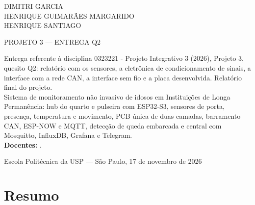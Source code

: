 \documentclass[12pt,a4paper]{article}
\newcommand{\docentes}{}
\begin{document}
	\begin{titlepage}
		\centering

		{\large DIMITRI GARCIA\\HENRIQUE GUIMAR\~AES MARGARIDO\\HENRIQUE SANTIAGO\\}

		\vspace{4cm}
		{\LARGE{PROJETO 3 --- ENTREGA Q2}} \\
		\vspace{2cm}
		\begin{flushright}
			\begin{minipage}{0.55\textwidth}
				Entrega referente à disciplina 0323221 - Projeto Integrativo 3 (2026),
				Projeto 3, quesito Q2: relatório com os sensores, a eletrônica de
				condicionamento de sinais, a interface com a rede CAN, a interface sem fio
				e a placa desenvolvida. Relatório final do projeto. \\[0.5cm]
				Sistema de monitoramento não invasivo de idosos em Instituições de Longa
				Permanência: hub do quarto e pulseira com ESP32-S3, sensores de porta,
				presença, temperatura e movimento, PCB única de duas camadas, barramento
				CAN, ESP-NOW e MQTT, detecção de queda embarcada e central com Mosquitto,
				InfluxDB, Grafana e Telegram.
				\ifx\docentes\empty\else\\[0.5cm]\textbf{Docentes:} \docentes.\fi
			\end{minipage}
		\end{flushright}

		\vfill
		{\small Escola Polit\'ecnica da USP --- S\~ao Paulo, 17 de novembro de 2026}
	\end{titlepage}

	\section*{Resumo}
	

	\newpage
	\tableofcontents
	\thispagestyle{fancy}
	\newpage
	\listoffigures
	\thispagestyle{fancy}
	\newpage

	
	
	
	
	
	
	
	
	
	
	
	
	
	

	

	\appendix
	
\end{document}
